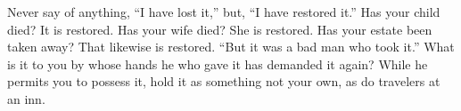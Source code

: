 Never say  of anything, ``I  have lost it,'' but,  ``I have restored  it.'' Has
your child died? It is restored. Has  your wife died? She is restored. Has your
estate been taken away?  That likewise is restored. ``But it was  a bad man who
took it.''  What is it  to you by  whose hands he who  gave it has  demanded it
again? While he permits  you to possess it, hold it as  something not your own,
as do travelers at an inn.
